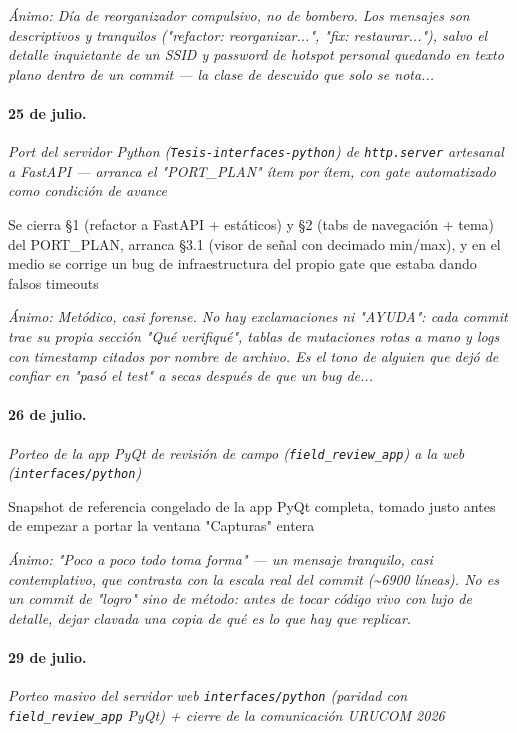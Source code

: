 {\footnotesize\itshape \'Animo: Día de reorganizador compulsivo, no de bombero. Los mensajes son descriptivos y tranquilos ("refactor: reorganizar...", "fix: restaurar..."), salvo el detalle inquietante de un SSID y password de hotspot personal quedando en texto plano dentro de un commit --- la clase de descuido que solo se nota...}

\paragraph{25 de julio.}
\emph{Port del servidor Python (\texttt{Tesis-interfaces-python}) de \texttt{http.server} artesanal a FastAPI --- arranca el "PORT\_PLAN" ítem por ítem, con gate automatizado como condición de avance}

Se cierra §1 (refactor a FastAPI + estáticos) y §2 (tabs de navegación + tema) del PORT\_PLAN, arranca §3.1 (visor de señal con decimado min/max), y en el medio se corrige un bug de infraestructura del propio gate que estaba dando falsos timeouts

{\footnotesize\itshape \'Animo: Metódico, casi forense. No hay exclamaciones ni "AYUDA": cada commit trae su propia sección "Qué verifiqué", tablas de mutaciones rotas a mano y logs con timestamp citados por nombre de archivo. Es el tono de alguien que dejó de confiar en "pasó el test" a secas después de que un bug de...}

\paragraph{26 de julio.}
\emph{Porteo de la app PyQt de revisión de campo (\texttt{field\_review\_app}) a la web (\texttt{interfaces/python})}

Snapshot de referencia congelado de la app PyQt completa, tomado justo antes de empezar a portar la ventana "Capturas" entera

{\footnotesize\itshape \'Animo: "Poco a poco todo toma forma" --- un mensaje tranquilo, casi contemplativo, que contrasta con la escala real del commit (\textasciitilde{}6900 líneas). No es un commit de "logro" sino de método: antes de tocar código vivo con lujo de detalle, dejar clavada una copia de qué es lo que hay que replicar.}

\paragraph{29 de julio.}
\emph{Porteo masivo del servidor web \texttt{interfaces/python} (paridad con \texttt{field\_review\_app} PyQt) + cierre de la comunicación URUCOM 2026}

